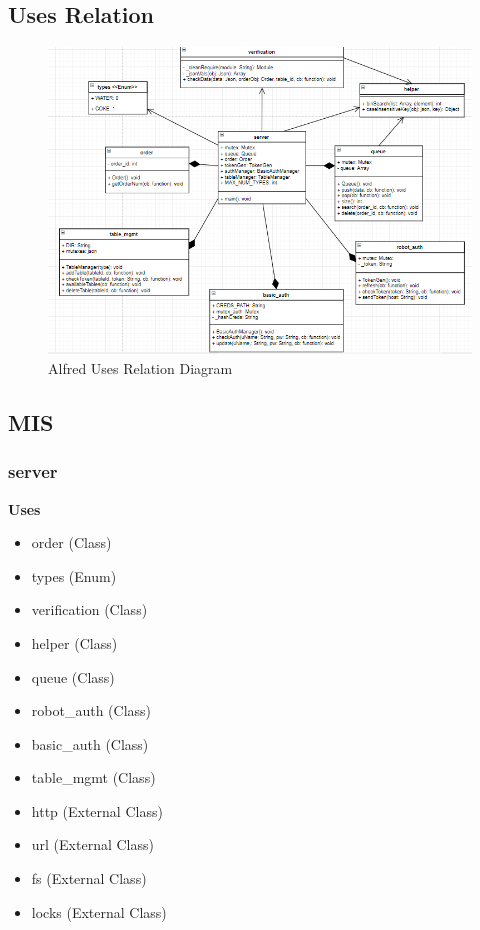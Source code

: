 \documentclass [10pt]{article}
\begin{document}

\pagebreak

\subsection{Uses Relation}
\begin{figure} [h!]
	\centering
	\includegraphics [scale = 0.55] {figures/server_class_diagram.PNG}
	\caption{Alfred Uses Relation Diagram}
\end{figure}


\subsection{MIS}


\subsubsection{server}
\textbf{Uses}
\begin{itemize}
	\item order (Class)
	\item types (Enum)
	\item verification (Class)
	\item helper (Class)
	\item queue (Class)
	\item robot\_auth (Class)
	\item basic\_auth (Class)
	\item table\_mgmt (Class)
	\item http (External Class)
	\item url (External Class)
	\item fs (External Class)
	\item locks (External Class)
\end{itemize}
\end{document}

